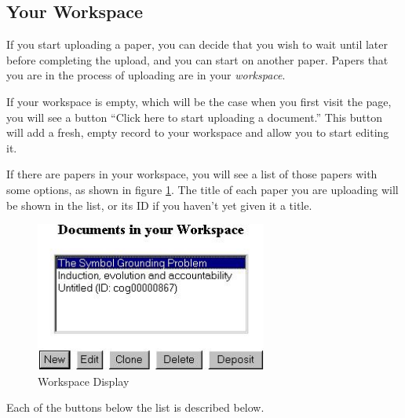 \subsection{Your Workspace}

If you start uploading a paper, you can decide that you wish to wait until later before completing the upload, and you can start on another paper. Papers that you are in the process of uploading are in your \emph{workspace}.

If your workspace is empty, which will be the case when you first visit the page, you will see a button ``Click here to start uploading a document.'' This button will add a fresh, empty record to your workspace and allow you to start editing it.

If there are papers in your workspace, you will see a list of those papers with some options, as shown in figure \ref{workspace_shot}. The title of each paper you are uploading will be shown in the list, or its ID if you haven't yet given it a title.

\begin{figure}
\centerline{\includegraphics[width=3.0in]{images/workspace-shot}}
\caption{\label{workspace_shot} Workspace Display}
\end{figure}

Each of the buttons below the list is described below.

